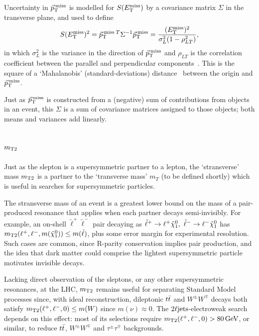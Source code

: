 Uncertainty in $\ptmiss$ is modelled for $\metsig$ by a covariance matrix
$\Sigma$ in the transverse plane, and used to define
\begin{equation}
\metsig^2
=
\ptmiss\,{}^T \Sigma^{-1} \ptmiss
=
\frac{(\met)^2}{\sigma_L^2(1 - \rho_{LT}^2)}
,
\end{equation}
in which $\sigma_L^2$ is the variance in the direction of $\ptmiss$ and
$\rho_{LT}$ is the correlation coefficient between the parallel and
perpendicular components~\cite{atlas_met_significance}.
This is the square of a `Mahalanobis' (standard-deviations)
distance~\cite{mahalanobis1936generalised} between the origin and $\ptmiss$.

Just as $\ptmiss$ is constructed from a (negative) sum of contributions from
objects in an event, this $\Sigma$ is a sum of covariance matrices assigned to
those objects; both means and variances add linearly.


\subsection{\texorpdfstring{$\mttwo$}{mT2}}
\label{sec:2ljets_mt2}
Just as the slepton is a supersymmetric partner to a lepton, the `stransverse'
mass $\mttwo$ is a partner to the `transverse mass' $m_T$
(to be defined shortly)
which is useful in searches for supersymmetric particles.

The stransverse mass of an event is a greatest lower bound on the mass of a
pair-produced resonance that applies when each partner decays semi-invisibly.
For example, an on-shell $\tilde\ell^+\tilde\ell^-$ pair decaying as
$\tilde\ell^+ \to \ell^+ \neutralino_1
,~
\tilde\ell^- \to \ell^- \neutralino_1$ has
$\mttwo(\ell^+, \ell^-, m(\neutralino_1)) \leq m(\tilde\ell)$, plus some error
margin for experimental resolution.
Such cases are common, since R-parity conservation implies pair production,
and the idea that dark matter could comprise the lightest supersymmetric
particle motivates invisible decays.

Lacking direct observation of the sleptons, or any other supersymmetric
resonances, at the LHC, $\mttwo$ remains useful for separating Standard Model
processes since, with ideal reconstruction,
dileptonic $\ttbar$ and $W^\pm W^\mp$ decays both
satisfy $\mttwo(\ell^+, \ell^-, 0) \leq m(W)$ since $m(\nu) \approx 0$.
The $\twoljets$-electroweak search depends on this effect:
most of its selections require $\mttwo(\ell^+, \ell^-, 0) > 80\,\eV[G]$,
or similar,
to reduce $\ttbar$, $W^\pm W^\mp$ and $\tau^\pm\tau^\mp$ backgrounds.

